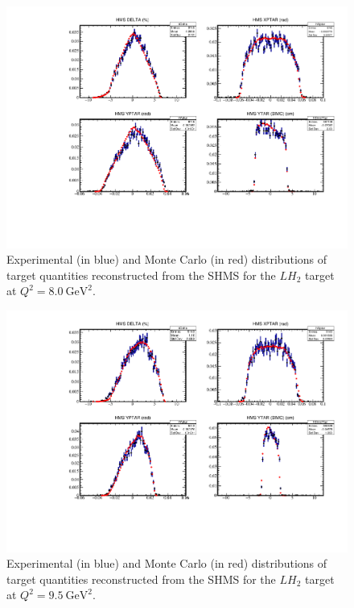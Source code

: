 \begin{figure}[!h]
    \centering
    \includegraphics[page=2,width=1.0\textwidth]{pass5_report/Report_h8.pdf}
    \caption{
            Experimental (in blue) and Monte Carlo (in red) distributions of
            target quantities reconstructed from the SHMS for
            the $LH_2$ target at $Q^2=\SI{8.0}{\giga\electronvolt\squared}$.
            }
    \label{fig:Report_h8.pdf}
\end{figure}


\begin{figure}[!h]
    \centering
    \includegraphics[page=2,width=1.0\textwidth]{pass5_report/Report_h95sm.pdf}
    \caption{
            Experimental (in blue) and Monte Carlo (in red) distributions of
            target quantities reconstructed from the SHMS for
            the $LH_2$ target at $Q^2=\SI{9.5}{\giga\electronvolt\squared}$.
            }
    \label{fig:Report_h95sm.pdf}
\end{figure}


